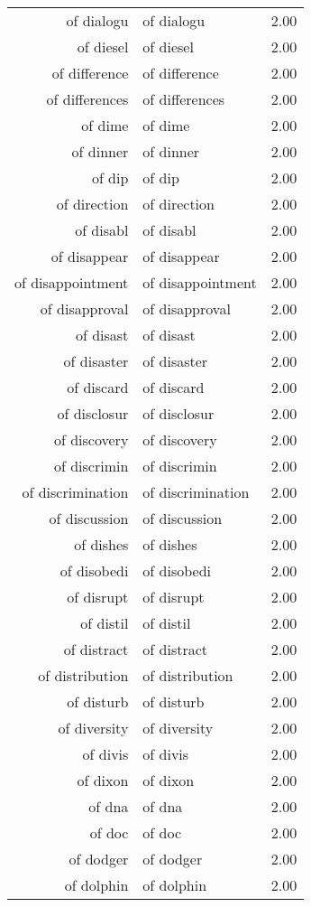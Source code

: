 \begin{table}[ht]
\begin{tabular}{rlr}
  of dialogu & of dialogu & 2.00 \\ 
  of diesel & of diesel & 2.00 \\ 
  of difference & of difference & 2.00 \\ 
  of differences & of differences & 2.00 \\ 
  of dime & of dime & 2.00 \\ 
  of dinner & of dinner & 2.00 \\ 
  of dip & of dip & 2.00 \\ 
  of direction & of direction & 2.00 \\ 
  of disabl & of disabl & 2.00 \\ 
  of disappear & of disappear & 2.00 \\ 
  of disappointment & of disappointment & 2.00 \\ 
  of disapproval & of disapproval & 2.00 \\ 
  of disast & of disast & 2.00 \\ 
  of disaster & of disaster & 2.00 \\ 
  of discard & of discard & 2.00 \\ 
  of disclosur & of disclosur & 2.00 \\ 
  of discovery & of discovery & 2.00 \\ 
  of discrimin & of discrimin & 2.00 \\ 
  of discrimination & of discrimination & 2.00 \\ 
  of discussion & of discussion & 2.00 \\ 
  of dishes & of dishes & 2.00 \\ 
  of disobedi & of disobedi & 2.00 \\ 
  of disrupt & of disrupt & 2.00 \\ 
  of distil & of distil & 2.00 \\ 
  of distract & of distract & 2.00 \\ 
  of distribution & of distribution & 2.00 \\ 
  of disturb & of disturb & 2.00 \\ 
  of diversity & of diversity & 2.00 \\ 
  of divis & of divis & 2.00 \\ 
  of dixon & of dixon & 2.00 \\ 
  of dna & of dna & 2.00 \\ 
  of doc & of doc & 2.00 \\ 
  of dodger & of dodger & 2.00 \\ 
  of dolphin & of dolphin & 2.00 \\ 

\end{tabular}
\end{table}
